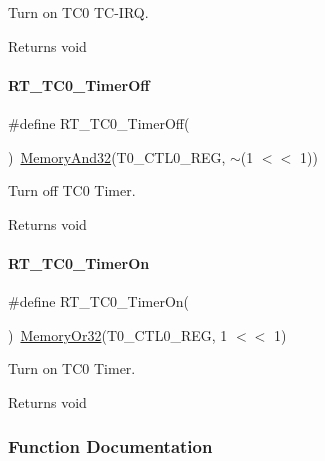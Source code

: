 Turn on T\+C0 T\+C-\/\+I\+RQ. 

\begin{DoxyReturn}{Returns}
void 
\end{DoxyReturn}
\mbox{\label{a00041_acbfad29faf802168f3281e5754e40aa9}} 
\paragraph{\texorpdfstring{R\+T\+\_\+\+T\+C0\+\_\+\+Timer\+Off}{RT\_TC0\_TimerOff}}
{\footnotesize\ttfamily \#define R\+T\+\_\+\+T\+C0\+\_\+\+Timer\+Off(\begin{DoxyParamCaption}{ }\end{DoxyParamCaption})~\mbox{\hyperlink{a00020_a5c1a2bd4c1bd4c2f429d8042a45327ff}{Memory\+And32}}(T0\+\_\+\+C\+T\+L0\+\_\+\+R\+EG, $\sim$(1 $<$$<$ 1))}



Turn off T\+C0 Timer. 

\begin{DoxyReturn}{Returns}
void 
\end{DoxyReturn}
\mbox{\label{a00041_aa7936fffa8b7bcd47751d2e89f81d4a9}} 
\paragraph{\texorpdfstring{R\+T\+\_\+\+T\+C0\+\_\+\+Timer\+On}{RT\_TC0\_TimerOn}}
{\footnotesize\ttfamily \#define R\+T\+\_\+\+T\+C0\+\_\+\+Timer\+On(\begin{DoxyParamCaption}{ }\end{DoxyParamCaption})~\mbox{\hyperlink{a00020_a9ea92ebccdef6bdaca4d00210cc7266d}{Memory\+Or32}}(T0\+\_\+\+C\+T\+L0\+\_\+\+R\+EG, 1 $<$$<$ 1)}



Turn on T\+C0 Timer. 

\begin{DoxyReturn}{Returns}
void 
\end{DoxyReturn}


\subsubsection{Function Documentation}
\mbox{\label{a00041_a7e5566d1cc48eb1c7e1ee9844e7c5be5}} 
